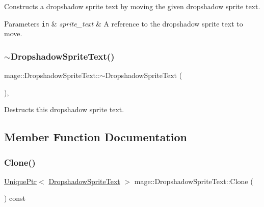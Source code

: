 Constructs a dropshadow sprite text by moving the given dropshadow sprite text.


\begin{DoxyParams}[1]{Parameters}
\mbox{\tt in}  & {\em sprite\+\_\+text} & A reference to the dropshadow sprite text to move. \\
\hline
\end{DoxyParams}
\hypertarget{classmage_1_1_dropshadow_sprite_text_a561b1be59d05bccb680969be792c0e28}{}\label{classmage_1_1_dropshadow_sprite_text_a561b1be59d05bccb680969be792c0e28} 
\subsubsection{\texorpdfstring{$\sim$\+Dropshadow\+Sprite\+Text()}{~DropshadowSpriteText()}}
{\footnotesize\ttfamily mage\+::\+Dropshadow\+Sprite\+Text\+::$\sim$\+Dropshadow\+Sprite\+Text (\begin{DoxyParamCaption}{ }\end{DoxyParamCaption})\hspace{0.3cm}{\ttfamily [virtual]}, {\ttfamily [default]}}

Destructs this dropshadow sprite text. 

\subsection{Member Function Documentation}
\hypertarget{classmage_1_1_dropshadow_sprite_text_a0dcce82b4a83fbd469d68adba21af220}{}\label{classmage_1_1_dropshadow_sprite_text_a0dcce82b4a83fbd469d68adba21af220} 
\subsubsection{\texorpdfstring{Clone()}{Clone()}}
{\footnotesize\ttfamily \hyperlink{namespacemage_a3316d7143a973e37adf1110f2e80ca31}{Unique\+Ptr}$<$ \hyperlink{classmage_1_1_dropshadow_sprite_text}{Dropshadow\+Sprite\+Text} $>$ mage\+::\+Dropshadow\+Sprite\+Text\+::\+Clone (\begin{DoxyParamCaption}{ }\end{DoxyParamCaption}) const}

